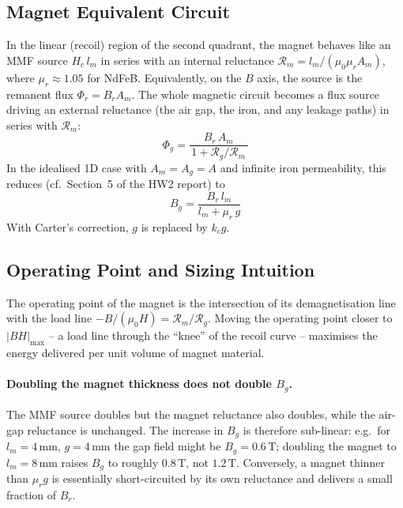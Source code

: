 \documentclass[12pt,a4paper]{article}
\newcommand{\unit}[1]{\ensuremath{\,\mathrm{#1}}}
\begin{document}
\subsection{Magnet Equivalent Circuit}

In the linear (recoil) region of the second quadrant, the magnet
behaves like an MMF source $H_c\,l_m$ in series with an internal
reluctance $\mathcal{R}_m = l_m/(\mu_0\mu_r A_m)$, where
$\mu_r\approx 1.05$ for NdFeB.
Equivalently, on the $B$ axis, the source is the remanent flux
$\Phi_r = B_r A_m$.
The whole magnetic circuit becomes a flux source driving an external
reluctance (the air gap, the iron, and any leakage paths) in series
with $\mathcal{R}_m$:
\begin{equation}
  \Phi_g = \frac{B_r\,A_m}{\,1 + \mathcal{R}_g/\mathcal{R}_m\,}
\end{equation}
In the idealised 1D case with $A_m = A_g = A$ and infinite iron
permeability, this reduces (cf.\ Section~5 of the HW2 report) to
\begin{equation}
  B_g = \frac{B_r\,l_m}{l_m + \mu_r\,g}
\end{equation}
With Carter's correction, $g$ is replaced by $k_c g$.

\subsection{Operating Point and Sizing Intuition}

The operating point of the magnet is the intersection of its
demagnetisation line with the load line $-B/(\mu_0 H) =
\mathcal{R}_m/\mathcal{R}_g$. Moving the operating point closer to
$|BH|_\text{max}$ -- a load line through the ``knee'' of the
recoil curve -- maximises the energy delivered per unit volume of
magnet material.

\paragraph{Doubling the magnet thickness does not double $B_g$.}
The MMF source doubles but the magnet reluctance also doubles, while
the air-gap reluctance is unchanged. The increase in $B_g$ is
therefore sub-linear: e.g.\ for $l_m = 4\unit{mm}$, $g = 4\unit{mm}$
the gap field might be $B_g = 0.6\unit{T}$; doubling the magnet to
$l_m = 8\unit{mm}$ raises $B_g$ to roughly $0.8\unit{T}$, not
$1.2\unit{T}$.
Conversely, a magnet thinner than $\mu_r g$ is essentially short-circuited
by its own reluctance and delivers a small fraction of $B_r$.
\end{document}
